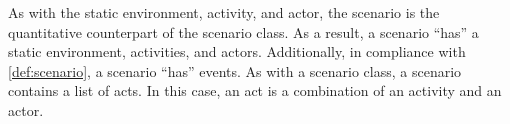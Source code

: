 As with the static environment, activity, and actor, the scenario is the quantitative counterpart of the scenario class. As a result, a scenario ``has'' a static environment, activities, and actors. Additionally, in compliance with \cref{def:scenario}, a scenario ``has'' events. As with a scenario class, a scenario contains a list of acts. In this case, an act is a combination of an activity and an actor.

\cbend


